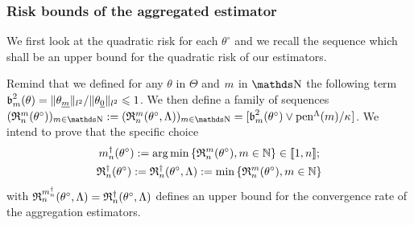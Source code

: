 \subsubsection{Risk bounds of the aggregated estimator}\label{au:rb}\label{AU:RB}
We first look at the quadratic risk for each $\theta^{\circ}$ and we recall the sequence which shall be an upper bound for the quadratic risk of our estimators.
\begin{de*}
Remind that we defined for any $\theta$ in $\Theta$ and $\Di$ in $\N$ the following term $\b_{m}^{2}(\theta) = \Vert \theta_{\underline{m}} \Vert_{l^{2}}/\Vert \theta_{\underline{0}} \Vert_{l^{2}} \leq 1$.
We then define a family of sequences $(\daRa{\Di}{(\xdf)})_{\Di \in \N} := (\daRa{\Di}{(\xdf,\Lambda)})_{\Di \in \N} = [\b_{m}^{2}(\theta^{\circ}) \vee \penSv/\cpen]$.
We intend to prove that the specific choice
\begin{multline*}
\aDi{\ssY}(\xdf):=\argmin\Nset[\Di\in\Nz]{\daRa{\Di}{(\xdf)}}\in\nset{1,\ssY}; \\
\naRa{(\xdf)}:=\naRa{(\xdf,\Lambda)}:=\min\Nset[\Di\in\Nz]{\daRa{\Di}{(\xdf)}}
\end{multline*}
with $\daRa{\aDi{\ssY}}{(\xdf,\Lambda)}=\naRa{(\xdf,\Lambda)}$ defines an upper bound for the convergence rate of the aggregation estimators.
\assEnd
\end{de*}

